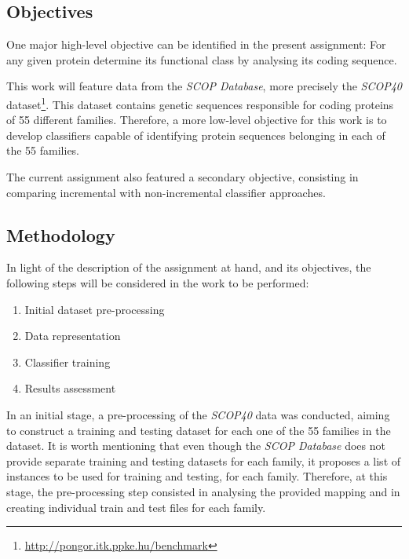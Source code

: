 \documentclass[11pt]{article}
\begin{document}
\subsection{Objectives}

One major high-level objective can be identified in the present assignment: For any given protein determine its functional class by analysing its coding sequence.

This work will feature data from the \emph{SCOP Database}\cite{murzin1995scop}, more precisely the \emph{SCOP40} dataset\footnote{\url{http://pongor.itk.ppke.hu/benchmark}}. This dataset contains genetic sequences responsible for coding proteins of 55 different families. Therefore, a more low-level objective for this work is to develop classifiers capable of identifying protein sequences belonging in each of the 55 families.

The current assignment also featured a secondary objective, consisting in comparing incremental with non-incremental classifier approaches. 

\subsection{Methodology}
\label{methodology}

In light of the description of the assignment at hand, and its objectives, the following steps will be considered in the work to be performed:

\begin{enumerate}
	\item Initial dataset pre-processing
	
	\item Data representation
	
	\item Classifier training
	
	\item Results assessment
\end{enumerate}

In an initial stage, a pre-processing of the \emph{SCOP40} data was conducted, aiming to construct a training and testing dataset for each one of the 55 families in the dataset. It is worth mentioning that even though the \emph{SCOP Database} does not provide separate training and testing datasets for each family, it proposes a list of instances to be used for training and testing, for each family. Therefore, at this stage, the pre-processing step consisted in analysing the provided mapping and in creating individual train and test files for each family.
\end{document}
